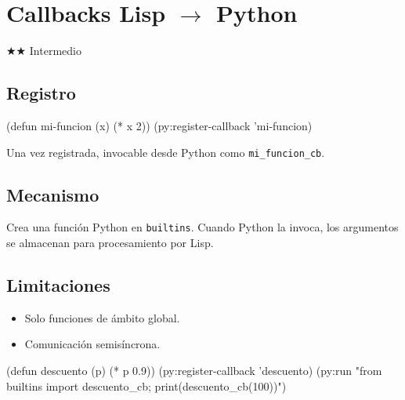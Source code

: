 \chapter{Callbacks Lisp $\rightarrow$ Python}
\label{chap:callbacks}
{\huge$\bigstar$}{\huge$\bigstar$} Intermedio

\section{Registro}
\begin{lispcode}
(defun mi-funcion (x) (* x 2))
(py:register-callback 'mi-funcion)
\end{lispcode}

Una vez registrada, invocable desde Python como \texttt{mi\_funcion\_cb}.

\section{Mecanismo}

Crea una función Python en \texttt{builtins}. Cuando Python la invoca,
los argumentos se almacenan para procesamiento por Lisp.

\section{Limitaciones}
\begin{itemize}
\item Solo funciones de ámbito global.
\item Comunicación semisíncrona.
\end{itemize}

\begin{examplebox}[title=Callback de descuento]
\begin{lispcode}
(defun descuento (p) (* p 0.9))
(py:register-callback 'descuento)
(py:run "from builtins import descuento_cb; print(descuento_cb(100))")
\end{lispcode}
\end{examplebox}

